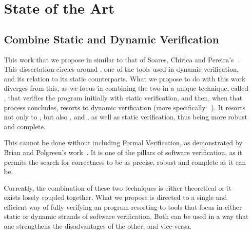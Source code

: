 
%

\makeatletter
\newcommand{\ntifpkgloaded}{%
  \@ifpackageloaded%
}
\makeatother


\chapter{State of the Art}
\label{cha:state_of_the_art}


\section{Combine Static and Dynamic Verification}
\label{sec:combine_static_and_dynamic_verification}

This work that we propose in similar to that of Soares, Chirica and Pereira's~\cite{Soares_Chirica_Pereira2024}. 
This dissertation circles around \gospellang, one of the tools used in 
dynamic verification, and its relation to its static counterparts. What we propose to do with this work 
diverges from this, as we focus in combining the two in a unique technique, called \monitors, that 
verifies the program initially with static verification, and then, when that process concludes, resorts to 
dynamic verification (more specifically \rac~\cite{Soares_Chirica_Pereira2024}). It resorts not only to 
\gospellang, but also \ortac, \why and \cameleer, as well as static verification, thus being more robust and 
complete.

This cannot be done without including Formal Verification, as demonstrated by Brian and Polgreen's 
work~\cite{Brian_Polgreen2025}. It is one of the pillars of software verification, as it permits the search for correctness 
to be as precise, robust and complete as it can be.

Currently, the combination of these two techniques is either theoretical or it exists losely coupled together. 
What we propose is directed to a single and efficient way of fully verifying an \ocaml program resorting to 
tools that focus in either static or dynamic strands of software verification. Both can be used in a way that 
one strengthens the disadvantages of the other, and vice-versa.

